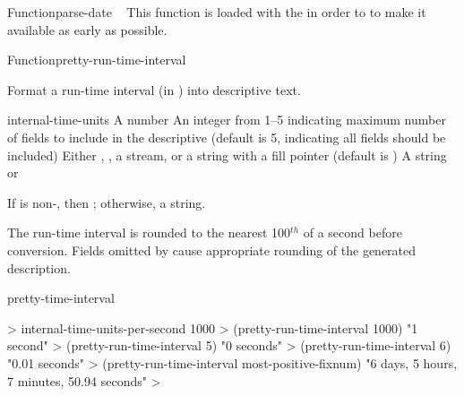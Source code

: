 \documentclass[10pt,twoside,english,pdftex]{article}
\begin{document}
\begin{functiondoc}{Function}{parse-date}{%
     
    \mbox{\returns{} }}
\fnnote
{}%
%
%
This function is loaded with the   in order
to to make it available as early as possible.
\end{functiondoc}


\begin{functiondoc}{Function}{pretty-run-time-interval}{%
      
    \returns{} }
% 
% 

\fnsyntax

\fnpurpose Format a run-time interval (in ) into
descriptive text.

\fnpackage {}

\fnmodule {}

\fnargs
\begin{args}{internal-time-units}
 A number
 An integer from 1--5 indicating maximum number of fields 
to include in the descriptive  (default is 5, indicating all 
fields should be included)
\arg[destination] Either \nil, , a stream, or a string with a fill 
pointer (default is \nil)
\arg[result] A string or \nil{}
\end{args}

\fnreturns If  is non-\nil, then \nil; otherwise, a string.

\fndescription The  run-time interval is rounded to
the nearest 100$^{th}$ of a second before conversion. Fields omitted by
 cause appropriate rounding of the generated description.

\begin{alsos}{pretty-time-interval}
\end{alsos}

\fnexamples
%
\W\supp
\begin{example}
  > internal-time-units-per-second
  1000
  > (pretty-run-time-interval 1000)
  "1 second"
  > (pretty-run-time-interval 5)
  "0 seconds"
  > (pretty-run-time-interval 6)
  "0.01 seconds"
  > (pretty-run-time-interval most-positive-fixnum)
  "6 days, 5 hours, 7 minutes, 50.94 seconds"
  >
\end{example}

\end{functiondoc}
\end{document}
